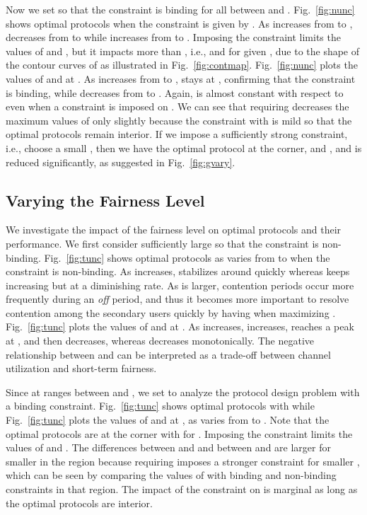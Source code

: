\documentclass[12pt,draftclsnofoot,onecolumn]{IEEEtran}
\begin{document}
Now we set  so that the constraint is binding for all  between  and .
Fig.~\ref{fig:nunc} shows optimal
protocols  when the constraint is given by . As  increases from  to ,  decreases
from  to  while  increases from  to .
Imposing the constraint limits the values of  and ,
but it impacts  more than , i.e.,  and  for given ,
due to the shape of the contour curves of  as illustrated in Fig.~\ref{fig:contmap}.
Fig.~\ref{fig:nunc} plots the values of  and 
at . As  increases from  to ,
 stays at , confirming that the constraint  is binding,
while  decreases from  to .
Again,  is almost constant with respect to  even when a constraint is imposed on .
We can see that requiring  decreases the maximum values of 
only slightly because the constraint with  is mild so that
the optimal protocols remain interior. If we impose a sufficiently strong constraint,
i.e., choose a small , then we have the optimal protocol at the corner,  and ,
and  is reduced significantly, as suggested in Fig.~\ref{fig:gvary}.

\subsection{Varying the Fairness Level}

We investigate the impact of the fairness level
on optimal protocols and their performance. We first
consider sufficiently large  so that the constraint is non-binding. Fig.~\ref{fig:tunc} shows optimal
protocols  as  varies from  to  when the constraint is non-binding.
As  increases,  stabilizes around 
quickly whereas  keeps increasing but at a diminishing rate.
As  is larger, contention periods occur more frequently during an \emph{off} period,
and thus it becomes more important to resolve contention among the secondary users quickly
by having  when maximizing .
Fig.~\ref{fig:tunc} plots the values of  and 
at . As  increases,  increases, reaches a peak at ,
and then decreases, whereas  decreases monotonically. The negative relationship
between  and  can be interpreted as a trade-off
between channel utilization and short-term fairness.

Since  at  ranges between 
and , we set  to analyze the protocol design
problem with a binding constraint.
Fig.~\ref{fig:tunc} shows optimal
protocols  with  while Fig.~\ref{fig:tunc} plots
the values of  and  at , as  varies from  to . Note that the optimal protocols are at the corner
with  for . Imposing the constraint 
limits the values of  and . The differences between  and  and between  and 
are larger for smaller  in the region  because requiring  imposes a stronger constraint
for smaller , which can be seen by comparing the values of 
with binding and non-binding constraints in that region. The impact of the constraint on  is marginal as long
as the optimal protocols are interior.
\end{document}
